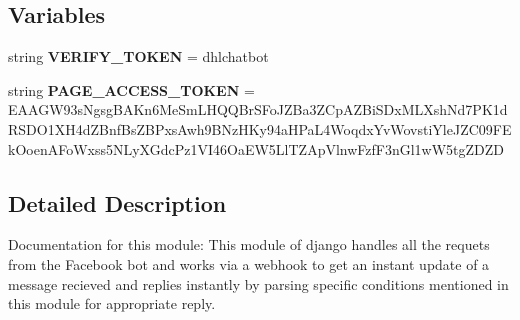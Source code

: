 \subsection*{Variables}
\begin{DoxyCompactItemize}
\item 
\mbox{\label{namespacemessengerbot_1_1views_acc5db9b1386d0938d9b1c07a9c83604e}} 
string {\bfseries V\+E\+R\+I\+F\+Y\+\_\+\+T\+O\+K\+EN} = \textquotesingle{}dhlchatbot\textquotesingle{}
\item 
\mbox{\label{namespacemessengerbot_1_1views_a22c4a4c96dbae1b10bd243bdbd7b0505}} 
string {\bfseries P\+A\+G\+E\+\_\+\+A\+C\+C\+E\+S\+S\+\_\+\+T\+O\+K\+EN} = \textquotesingle{}E\+A\+A\+G\+W93s\+Ngsg\+B\+A\+Kn6\+Me\+Sm\+L\+H\+Q\+Q\+Br\+S\+Fo\+J\+Z\+Ba3\+Z\+Cp\+A\+Z\+Bi\+S\+Dx\+M\+L\+Xsh\+Nd7\+P\+K1d\+R\+S\+D\+O1\+X\+H4d\+Z\+Bnf\+Bs\+Z\+B\+Pxs\+Awh9\+B\+Nz\+H\+Ky94a\+H\+Pa\+L4\+Woqdx\+Yv\+Wovsti\+Yle\+J\+Z\+C09\+F\+Ek\+Ooen\+A\+Fo\+Wxss5\+N\+Ly\+X\+Gdc\+Pz1\+V\+I46\+Oa\+E\+W5\+Ll\+T\+Z\+Ap\+Vlnw\+Fzf\+F3n\+Gl1w\+W5tg\+Z\+D\+ZD\textquotesingle{}
\end{DoxyCompactItemize}


\subsection{Detailed Description}
\begin{DoxyVerb}Documentation for this module:
This module of django handles all the requets from the Facebook bot and works via a webhook to get an instant update of a message recieved and replies instantly by parsing specific conditions mentioned in this module for appropriate reply. 
\end{DoxyVerb}
 